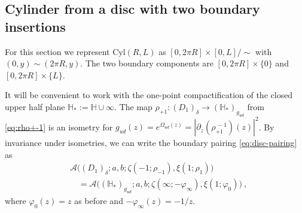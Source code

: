 \documentclass[11pt,a4paper]{article}
\numberwithin{equation}{section}
\begin{document}
\subsection{Cylinder from a disc with two boundary insertions}

For this section we represent $\mathrm{Cyl}(R,L)$ as $[0,2 \pi R] \times [0,L] / {\sim}$ with $(0,y) \sim (2 \pi R,y)$. The two boundary components are $[0,2 \pi R] \times \{0\}$ and $[0,2 \pi R] \times \{L\}$.

It will be convenient to work with the one-point compactification of the closed upper half plane $\mathbb{H}_* := \mathbb{H} \cup \infty$. 
The map $\rho_{+1} : (D_1)_\delta \to (\mathbb{H}_*)_{g_{ud}}$ from \eqref{eq:rho+-1} is an isometry for $g_{ud}(z) = e^{\Omega_{ud}(z)} = |\partial_z (\rho_{+1}^{\,-1})(z)|^2$. By invariance under isometries, we can write the boundary pairing \eqref{eq:disc-pairing} as
\begin{align}
    &\mathcal{A}\big((D_1)_\delta;a,b;\zeta(-1;\rho_{-1}),\xi(1;\rho_{1})\big)
    \nonumber \\
    & \quad =
    \mathcal{A}\big((\mathbb{H}_*)_{g_{ud}};a,b;\zeta(\infty;-\varphi_{\infty}),\xi(1;\varphi_{0})\big) \ ,
\end{align}
where $\varphi_0(z)=z$ as before and $-\varphi_\infty(z) = -1/z$.
\end{document}
